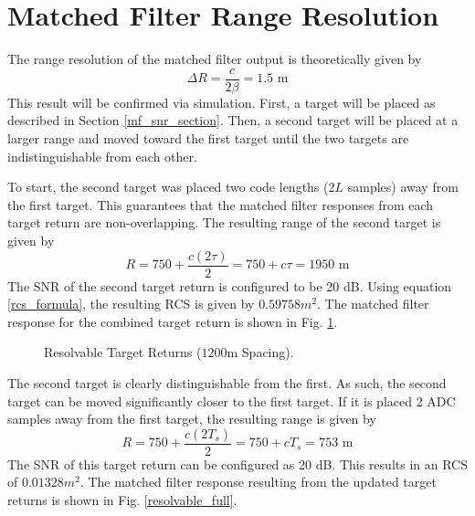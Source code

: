 \documentclass[conference]{IEEEtran}
\begin{document}
\section{Matched Filter Range Resolution} 
The range resolution of the matched filter output is theoretically given by
\begin{equation}
\Delta R = \frac{c}{2\beta} = 1.5 \text{ m}
\end{equation}
This result will be confirmed via simulation. First, a target will be placed as described in Section \ref{mf_snr_section}. Then, a second target will be placed at a larger range and moved toward the first target until the two targets are indistinguishable from each other. 
\par
To start, the second target was placed two code lengths ($2L$ samples) away from the first target. This guarantees that the matched filter responses from each target return are non-overlapping. The resulting range of the second target is given by
\begin{equation}
R = 750 + \frac{c(2\tau)}{2} = 750 + c\tau = 1950 \text{ m}
\end{equation}
The SNR of the second target return is configured to be 20 dB. Using equation \eqref{rcs_formula}, the resulting RCS is given by $0.59758m^2$. The matched filter response for the combined target return is shown in Fig. \ref{mf_output_clearly_resolvable}.
\begin{figure}[H]
\centerline{}
\caption{Resolvable Target Returns ($1200$m Spacing).}
\label{mf_output_clearly_resolvable}
\end{figure}
\par
The second target is clearly distinguishable from the first. As such, the second target can be moved significantly closer to the first target. If it is placed 2 ADC samples away from the first target, the resulting range is given by
\begin{equation}
R = 750 + \frac{c(2T_s)}{2} = 750 + cT_s = 753 \text{ m}
\end{equation}
The SNR of this target return can be configured as 20 dB. This results in an RCS of $0.01328m^2$. The matched filter response resulting from the updated target returns is shown in Fig. \ref{resolvable_full}.
\end{document}
